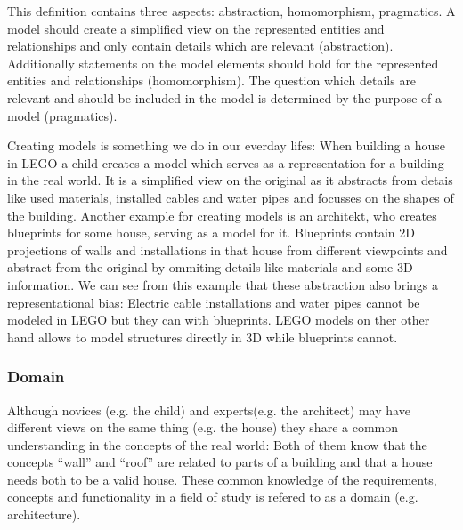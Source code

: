 \documentclass[runningheads,a4paper]{llncs}
\begin{document}
  This definition contains three aspects: abstraction, homomorphism, pragmatics.
  A model should create a simplified view on the represented entities and relationships and 
  only contain details which are relevant (abstraction).
  Additionally statements on the model elements should hold for the represented entities and relationships (homomorphism).
  The question which details are relevant and should be included in the model is determined by the purpose of a model (pragmatics).  
 
  Creating models is something we do in our everday lifes:
  When building a house in LEGO a child creates a model which serves as a representation for a building in the real world.
  It is a simplified view on the original as it abstracts from detais like used materials, installed cables and water pipes and focusses
  on the shapes of the building.
  Another example for creating models is an architekt, who creates blueprints for some house, serving as a model for it.
  Blueprints contain 2D projections of walls and installations in that house from different viewpoints and abstract from the original by ommiting
  details like materials and some 3D information. 
  We can see from this example that these abstraction also brings a representational bias:
  Electric cable installations and water pipes cannot be modeled in LEGO but they can with blueprints.
  LEGO models on ther other hand allows to model structures directly in 3D while blueprints cannot.
  
\subsubsection{Domain}
  
  Although novices (e.g. the child) and experts(e.g. the architect) may have different views on the same thing (e.g. the house)
  they share a common understanding in the concepts of the real world: 
  Both of them know that the concepts ``wall'' and ``roof'' are related to parts of a building and that a house needs both to be a valid house.
  These common knowledge of the requirements, concepts and functionality in a field of study is refered to as a domain (e.g. architecture). 
  
  
\end{document}
